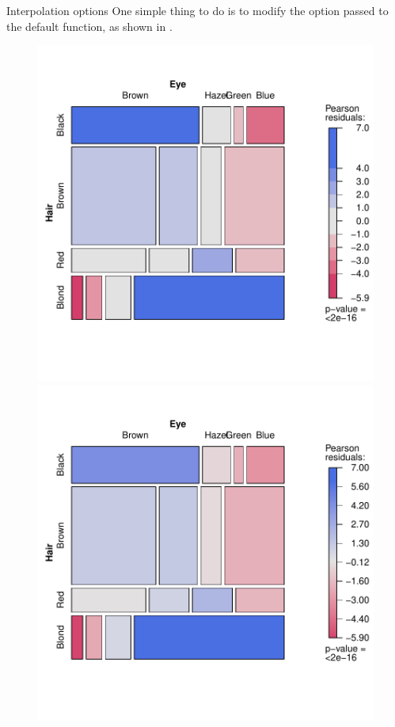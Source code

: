 \documentclass[11pt]{book}
\renewenvironment{knitrout}{\small\renewcommand{\baselinestretch}{.85}}{} %
\begin{document}
\begin{Example}[interp]{Interpolation options}
One simple thing to do is to modify the  option passed to the
default  function, as shown in .
\begin{knitrout}
\color{fgcolor}\begin{kframe}
\begin{alltt}
 \hlstd{=}\hlstd{,} \hlstd{=}\hlstd{(}\hlstd{=}\hlopt{:}\hlstd{))}

 \hlkwb{<-} \hlstd{(}\hlstd{)} \hlopt{/}\hlstd{,} \hlstd{)}
 \hlstd{=}\hlstd{,} \hlstd{=}\hlstd{(}
\end{alltt}
\end{kframe}\begin{figure}[!htbp]


\centerline{\includegraphics[width=.49\textwidth]{ch05/fig/HE-interp1} 
\includegraphics[width=.49\textwidth]{ch05/fig/HE-interp2} }


\end{figure}
\end{knitrout}
\end{Example}
\end{document}
